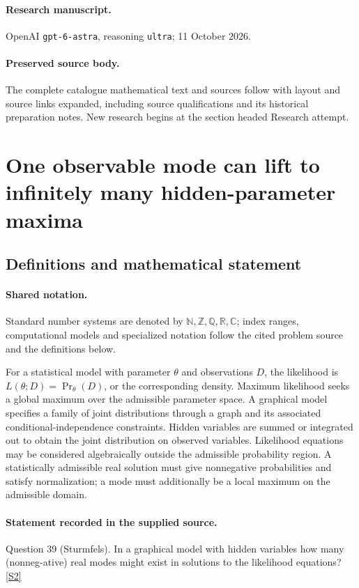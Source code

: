 \documentclass[11pt]{article}
\begin{document}
\paragraph{Research manuscript.} OpenAI \texttt{gpt-6-astra}, reasoning \texttt{ultra}; 11 October 2026.
\paragraph{Preserved source body.} The complete catalogue mathematical text and sources follow with layout and source links expanded, including source qualifications and its historical preparation notes. New research begins at the section headed Research attempt.

\section{One observable mode can lift to infinitely many hidden-parameter maxima}\label{statement}

\subsection{Definitions and mathematical statement}

\paragraph{Shared notation.}Standard number systems are denoted by $\mathbb N,\mathbb Z,\mathbb Q,\mathbb R,\mathbb C$; index ranges, computational models and specialized notation follow the cited problem source and the definitions below.


For a statistical model with parameter $\theta$ and observations $D$, the likelihood is $L(\theta;D)=\Pr_\theta(D)$, or the corresponding density. Maximum likelihood seeks a global maximum over the admissible parameter space. A graphical model specifies a family of joint distributions through a graph and its associated conditional-independence constraints. Hidden variables are summed or integrated out to obtain the joint distribution on observed variables. Likelihood equations may be considered algebraically outside the admissible probability region. A statistically admissible real solution must give nonnegative probabilities and satisfy normalization; a mode must additionally be a local maximum on the admissible domain.
\paragraph{Statement recorded in the supplied source.}
Question 39 (Sturmfels). In a graphical model with hidden variables how many (nonneg-ative) real modes might exist in solutions to the likelihood equations? \href{https://aimath.org/WWN/compalgstat/compalgstat.pdf}{[S2]}
\end{document}
